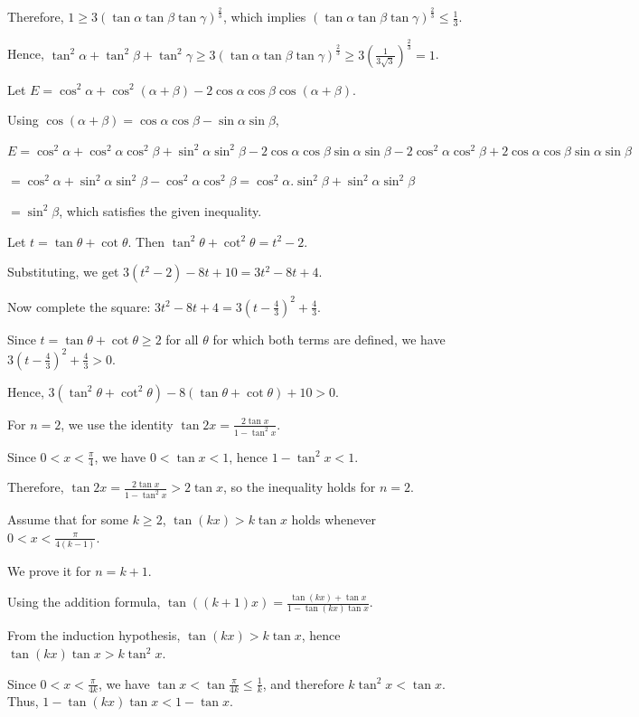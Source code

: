   Therefore,
  $1\ge3(\tan\alpha\tan\beta\tan\gamma)^{\frac23}$,
  which implies
  $(\tan\alpha\tan\beta\tan\gamma)^{\frac23}\le\frac13$.

  Hence,
  $\tan^2\alpha+\tan^2\beta+\tan^2\gamma
  \ge3(\tan\alpha\tan\beta\tan\gamma)^{\frac23}
  \ge3\left(\frac1{3\sqrt3}\right)^{\frac23} =1$.
\item Let $E=\cos^2\alpha+\cos^2(\alpha+\beta)-2\cos\alpha\cos\beta\cos(\alpha+\beta)$.

  Using $\cos(\alpha+\beta)=\cos\alpha\cos\beta-\sin\alpha\sin\beta$,

  $E = \cos^2\alpha + \cos^2\alpha\cos^2\beta + \sin^2\alpha\sin^2\beta -
  2\cos\alpha\cos\beta\sin\alpha\sin\beta - 2\cos^2\alpha\cos^2\beta +
  2\cos\alpha\cos\beta\sin\alpha\sin\beta$

  $= \cos^2\alpha + \sin^2\alpha\sin^2\beta - \cos^2\alpha\cos^2\beta = \cos^2\alpha.\sin^2\beta
  + \sin^2\alpha\sin^2\beta$

  $= \sin^2\beta$, which satisfies the given inequality.
\item Let $t=\tan\theta+\cot\theta$. Then $\tan^2\theta+\cot^2\theta=t^2-2$.

  Substituting, we get $3(t^2-2)-8t+10 =3t^2-8t+4$.

  Now complete the square: $3t^2-8t+4 =3\left(t-\frac43\right)^2+\frac43$.

  Since $t=\tan\theta+\cot\theta\ge2$ for all $\theta$ for which both terms are defined,
  we have
  $3\left(t-\frac43\right)^2+\frac43>0$.

  Hence, $3(\tan^2\theta+\cot^2\theta)-8(\tan\theta+\cot\theta)+10>0$.
\item For $n=2$, we use the identity
  $\tan 2x=\frac{2\tan x}{1-\tan^2 x}$.

  Since $0<x<\frac\pi4$, we have $0<\tan x<1$, hence $1-\tan^2 x<1$.

  Therefore, $\tan 2x=\frac{2\tan x}{1-\tan^2 x}>2\tan x$, so the inequality holds for $n=2$.

  Assume that for some $k\ge2$, $\tan(kx)>k\tan x$
  holds whenever $0<x<\frac{\pi}{4(k-1)}$.

  We prove it for $n=k+1$.

  Using the addition formula, $\tan((k+1)x)=\frac{\tan(kx)+\tan x}{1-\tan(kx)\tan x}$.

  From the induction hypothesis, $\tan(kx)>k\tan x$, hence $\tan(kx)\tan x>k\tan^2 x$.

  Since $0<x<\frac{\pi}{4k}$, we have $\tan x<\tan\frac{\pi}{4k}\le\frac1k$, and therefore
  $k\tan^2 x<\tan x$. Thus, $1-\tan(kx)\tan x<1-\tan x$.

